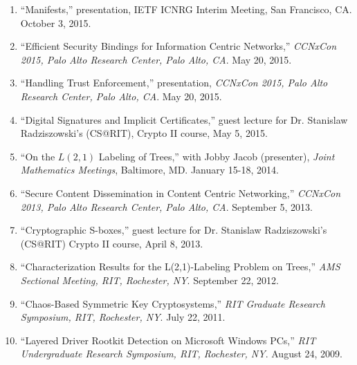 \documentclass[10pt]{res} %
\begin{document}
\begin{resume}
\begin{enumerate}[T-1.]
\item ``Manifests,'' presentation, IETF ICNRG Interim Meeting, San Francisco, CA. October 3, 2015.

\item ``Efficient Security Bindings for Information Centric Networks,'' \emph{CCNxCon 2015, Palo Alto Research Center, Palo Alto, CA}. May 20, 2015.

\item ``Handling Trust Enforcement,'' presentation, \emph{CCNxCon 2015, Palo Alto Research Center, Palo Alto, CA}. May 20, 2015.

\item ``Digital Signatures and Implicit Certificates,'' guest lecture for Dr. Stanislaw Radziszowski's (CS@RIT), Crypto II course, May 5, 2015.

\item ``On the $L(2,1)$ Labeling of Trees,'' with Jobby Jacob (presenter), \emph{Joint Mathematics Meetings}, Baltimore, MD. January 15-18, 2014.

\item ``Secure Content Dissemination in Content Centric Networking,'' \emph{CCNxCon 2013, Palo Alto Research Center, Palo Alto, CA}. September 5, 2013.

\item ``Cryptographic S-boxes,'' guest lecture for Dr. Stanislaw Radziszowski's (CS@RIT) Crypto II course, April 8, 2013.

\item ``Characterization Results for the L(2,1)-Labeling Problem on Trees,'' \emph{AMS Sectional Meeting, RIT, Rochester, NY}. September 22, 2012.

\item ``Chaos-Based Symmetric Key Cryptosystems,'' \emph{RIT Graduate Research Symposium, RIT, Rochester, NY}. July 22, 2011.

\item ``Layered Driver Rootkit Detection on Microsoft Windows PCs,'' \emph{RIT Undergraduate Research Symposium, RIT, Rochester, NY}. August 24, 2009.
\end{enumerate}
\vspace*{-16pt}





\end{resume}
\end{document}
